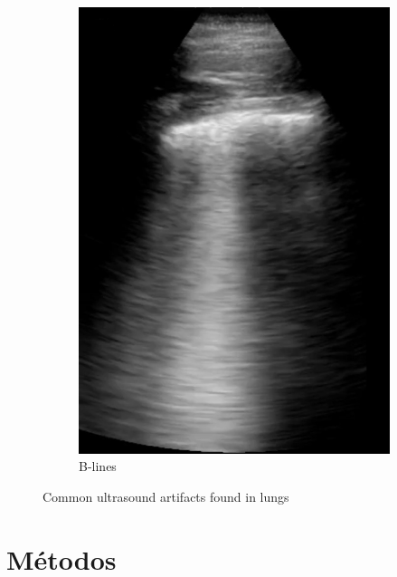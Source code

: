 \documentclass[11pt]{article} %
\begin{document}
\begin{figure}
\begin{subfigure}{0.3\textwidth}
		\includegraphics[width=\textwidth]{figuras/blines.jpg}
		\caption{B-lines}
		\end{subfigure}	
	\caption{Common ultrasound artifacts found in lungs}	
	\end{figure}
	
	
	
	
\section{Métodos}
\end{document}
